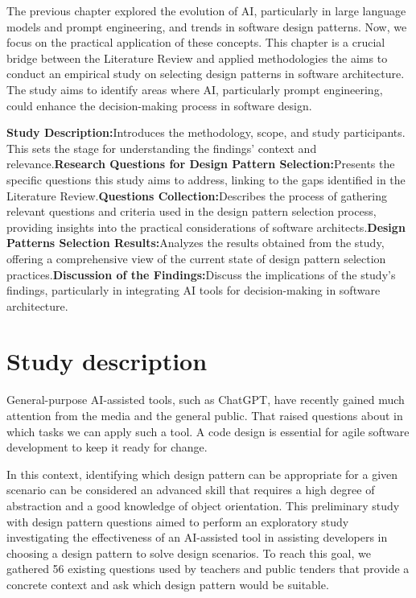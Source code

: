 

The previous chapter explored the evolution of AI, particularly in large language models and prompt engineering, and trends in software design patterns. Now, we focus on the practical application of these concepts. This chapter is a crucial bridge between the Literature Review and applied methodologies the aims to conduct an empirical study on selecting design patterns in software architecture. The study aims to identify areas where AI, particularly prompt engineering, could enhance the decision-making process in software design.

\textbf{Study Description:}Introduces the methodology, scope, and study participants. This sets the stage for understanding the findings' context and relevance.\textbf{Research Questions for Design Pattern Selection:}Presents the specific questions this study aims to address, linking to the gaps identified in the Literature Review.\textbf{Questions Collection:}Describes the process of gathering relevant questions and criteria used in the design pattern selection process, providing insights into the practical considerations of software architects.\textbf{Design Patterns Selection Results:}Analyzes the results obtained from the study, offering a comprehensive view of the current state of design pattern selection practices.\textbf{Discussion of the Findings:}Discuss the implications of the study’s findings, particularly in integrating AI tools for decision-making in software architecture.

\section{Study description}

General-purpose AI-assisted tools, such as ChatGPT, have recently gained much attention from the media and the general public. That raised questions about in which tasks we can apply such a tool. A code design is essential for agile software development to keep it ready for change. 

In this context, identifying which design pattern can be appropriate for a given scenario can be considered an advanced skill that requires a high degree of abstraction and a good knowledge of object orientation. This preliminary study with design pattern questions aimed to perform an exploratory study investigating the effectiveness of an AI-assisted tool in assisting developers in choosing a design pattern to solve design scenarios. To reach this goal, we gathered 56 existing questions used by teachers and public tenders that provide a concrete context and ask which design pattern would be suitable. 

